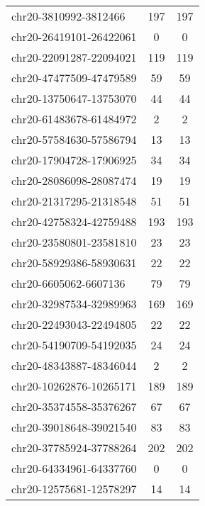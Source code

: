 \begin{longtable}{lSS}
	chr20-3810992-3812466   & 197  & 197                             \\
	chr20-26419101-26422061 & 0    & 0                               \\
	chr20-22091287-22094021 & 119  & 119                             \\
	chr20-47477509-47479589 & 59   & 59                              \\
	chr20-13750647-13753070 & 44   & 44                              \\
	chr20-61483678-61484972 & 2    & 2                               \\
	chr20-57584630-57586794 & 13   & 13                              \\
	chr20-17904728-17906925 & 34   & 34                              \\
	chr20-28086098-28087474 & 19   & 19                              \\
	chr20-21317295-21318548 & 51   & 51                              \\
	chr20-42758324-42759488 & 193  & 193                             \\
	chr20-23580801-23581810 & 23   & 23                              \\
	chr20-58929386-58930631 & 22   & 22                              \\
	chr20-6605062-6607136   & 79   & 79                              \\
	chr20-32987534-32989963 & 169  & 169                             \\
	chr20-22493043-22494805 & 22   & 22                              \\
	chr20-54190709-54192035 & 24   & 24                              \\
	chr20-48343887-48346044 & 2    & 2                               \\
	chr20-10262876-10265171 & 189  & 189                             \\
	chr20-35374558-35376267 & 67   & 67                              \\
	chr20-39018648-39021540 & 83   & 83                              \\
	chr20-37785924-37788264 & 202  & 202                             \\
	chr20-64334961-64337760 & 0    & 0                               \\
	chr20-12575681-12578297 & 14   & 14                              \\

\end{longtable}
